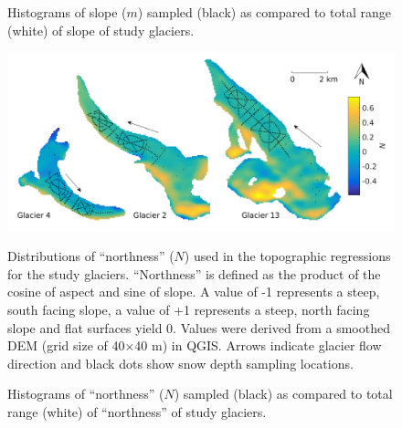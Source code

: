 \documentclass{sfuthesis}
\newcommand{\topomap}{Arrows indicate glacier flow direction and black dots show snow depth sampling locations. }
\begin{document}
\begin{figure}[H]
	\caption{Histograms of slope ($m$) sampled (black) as compared to total range (white) of slope of study glaciers.}
	\label{sampledRange:slope}
\end{figure}

\begin{figure}[H]
	\centering
	\includegraphics[width=\textwidth]{Map_northness.png}\\
	\caption{Distributions of ``northness'' ($N$) used in the topographic regressions for the study glaciers. ``Northness'' is defined as the product of the cosine of aspect and sine of slope. A value of -1 represents a steep, south facing slope, a value of +1 represents a steep, north facing slope and flat surfaces yield 0. Values were derived from a smoothed DEM (grid size of 40$\times$40 m) in QGIS. \topomap}
	\label{map:northness}
\end{figure}

\begin{figure}[H]
	\caption{Histograms of ``northness'' ($N$) sampled (black) as compared to total range (white) of ``northness'' of study glaciers.}
	\label{sampledRange:northness}
\end{figure}
\end{document}
